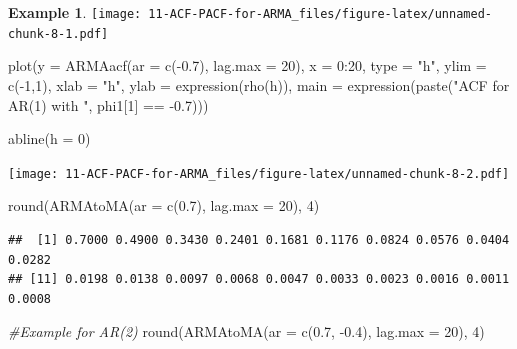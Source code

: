 \documentclass[
]{book}
\newenvironment{Shaded}{\begin{snugshade}}{\end{snugshade}}
\newcommand{\AttributeTok}[1]{\textcolor[rgb]{0.77,0.63,0.00}{#1}}
\newcommand{\CommentTok}[1]{\textcolor[rgb]{0.56,0.35,0.01}{\textit{#1}}}
\newcommand{\DecValTok}[1]{\textcolor[rgb]{0.00,0.00,0.81}{#1}}
\newcommand{\FloatTok}[1]{\textcolor[rgb]{0.00,0.00,0.81}{#1}}
\newcommand{\FunctionTok}[1]{\textcolor[rgb]{0.00,0.00,0.00}{#1}}
\newcommand{\NormalTok}[1]{#1}
\newcommand{\SpecialCharTok}[1]{\textcolor[rgb]{0.00,0.00,0.00}{#1}}
\newcommand{\StringTok}[1]{\textcolor[rgb]{0.31,0.60,0.02}{#1}}
\theoremstyle{definition}
\theoremstyle{definition}
\newtheorem{example}{Example}[chapter]
\theoremstyle{definition}
\theoremstyle{definition}
\theoremstyle{remark}
\begin{document}
\begin{example}
\texttt{[image: 11-ACF-PACF-for-ARMA\_files/figure-latex/unnamed-chunk-8-1.pdf]}

\begin{Shaded}
\begin{Highlighting}[]
\FunctionTok{plot}\NormalTok{(}\AttributeTok{y =} \FunctionTok{ARMAacf}\NormalTok{(}\AttributeTok{ar =} \FunctionTok{c}\NormalTok{(}\SpecialCharTok{{-}}\FloatTok{0.7}\NormalTok{), }\AttributeTok{lag.max =} \DecValTok{20}\NormalTok{), }\AttributeTok{x =} \DecValTok{0}\SpecialCharTok{:}\DecValTok{20}\NormalTok{, }\AttributeTok{type =} \StringTok{"h"}\NormalTok{, }\AttributeTok{ylim =} \FunctionTok{c}\NormalTok{(}\SpecialCharTok{{-}}\DecValTok{1}\NormalTok{,}\DecValTok{1}\NormalTok{), }\AttributeTok{xlab =} \StringTok{"h"}\NormalTok{, }\AttributeTok{ylab =} \FunctionTok{expression}\NormalTok{(}\FunctionTok{rho}\NormalTok{(h)),}
       \AttributeTok{main =} \FunctionTok{expression}\NormalTok{(}\FunctionTok{paste}\NormalTok{(}\StringTok{"ACF for AR(1) with "}\NormalTok{, phi1[}\DecValTok{1}\NormalTok{] }\SpecialCharTok{==} \SpecialCharTok{{-}}\FloatTok{0.7}\NormalTok{)))}
  
\FunctionTok{abline}\NormalTok{(}\AttributeTok{h =} \DecValTok{0}\NormalTok{)}
\end{Highlighting}
\end{Shaded}

\texttt{[image: 11-ACF-PACF-for-ARMA\_files/figure-latex/unnamed-chunk-8-2.pdf]}

\begin{Shaded}
\begin{Highlighting}[]
\FunctionTok{round}\NormalTok{(}\FunctionTok{ARMAtoMA}\NormalTok{(}\AttributeTok{ar =} \FunctionTok{c}\NormalTok{(}\FloatTok{0.7}\NormalTok{), }\AttributeTok{lag.max =} \DecValTok{20}\NormalTok{), }\DecValTok{4}\NormalTok{)}
\end{Highlighting}
\end{Shaded}

\begin{verbatim}
##  [1] 0.7000 0.4900 0.3430 0.2401 0.1681 0.1176 0.0824 0.0576 0.0404 0.0282
## [11] 0.0198 0.0138 0.0097 0.0068 0.0047 0.0033 0.0023 0.0016 0.0011 0.0008
\end{verbatim}

\begin{Shaded}
\begin{Highlighting}[]
\CommentTok{\#Example for AR(2)}
\FunctionTok{round}\NormalTok{(}\FunctionTok{ARMAtoMA}\NormalTok{(}\AttributeTok{ar =} \FunctionTok{c}\NormalTok{(}\FloatTok{0.7}\NormalTok{, }\SpecialCharTok{{-}}\FloatTok{0.4}\NormalTok{), }\AttributeTok{lag.max =} \DecValTok{20}\NormalTok{), }\DecValTok{4}\NormalTok{)}
\end{Highlighting}
\end{Shaded}


\end{example}
\end{document}
